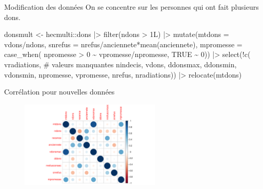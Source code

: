 \documentclass[
  ignorenonframetext,
]{beamer}
\newenvironment{Shaded}{\begin{snugshade}}{\end{snugshade}}
\newcommand{\AttributeTok}[1]{\textcolor[rgb]{0.40,0.45,0.13}{#1}}
\newcommand{\CommentTok}[1]{\textcolor[rgb]{0.37,0.37,0.37}{#1}}
\newcommand{\ConstantTok}[1]{\textcolor[rgb]{0.56,0.35,0.01}{#1}}
\newcommand{\DecValTok}[1]{\textcolor[rgb]{0.68,0.00,0.00}{#1}}
\newcommand{\FunctionTok}[1]{\textcolor[rgb]{0.28,0.35,0.67}{#1}}
\newcommand{\NormalTok}[1]{\textcolor[rgb]{0.00,0.23,0.31}{#1}}
\newcommand{\OtherTok}[1]{\textcolor[rgb]{0.00,0.23,0.31}{#1}}
\newcommand{\SpecialCharTok}[1]{\textcolor[rgb]{0.37,0.37,0.37}{#1}}
\begin{document}
\begin{frame}[fragile]{Modification des données}
\protect\hypertarget{modification-des-donnuxe9es}{}
On se concentre sur les personnes qui ont fait plusieurs dons.

\begin{Shaded}
\begin{Highlighting}[numbers=left,,]
\NormalTok{donsmult }\OtherTok{\textless{}{-}}\NormalTok{ hecmulti}\SpecialCharTok{::}\NormalTok{dons }\SpecialCharTok{|\textgreater{}}
  \FunctionTok{filter}\NormalTok{(ndons }\SpecialCharTok{\textgreater{}}\NormalTok{ 1L) }\SpecialCharTok{|\textgreater{}}
  \FunctionTok{mutate}\NormalTok{(}\AttributeTok{mtdons =}\NormalTok{ vdons}\SpecialCharTok{/}\NormalTok{ndons,}
         \AttributeTok{snrefus =}\NormalTok{ nrefus}\SpecialCharTok{/}\NormalTok{anciennete}\SpecialCharTok{*}\FunctionTok{mean}\NormalTok{(anciennete),}
         \AttributeTok{mpromesse =} \FunctionTok{case\_when}\NormalTok{(}
\NormalTok{           npromesse }\SpecialCharTok{\textgreater{}} \DecValTok{0} \SpecialCharTok{\textasciitilde{}}\NormalTok{ vpromesse}\SpecialCharTok{/}\NormalTok{npromesse,}
           \ConstantTok{TRUE} \SpecialCharTok{\textasciitilde{}} \DecValTok{0}\NormalTok{)) }\SpecialCharTok{|\textgreater{}}
  \FunctionTok{select}\NormalTok{(}\SpecialCharTok{!}\FunctionTok{c}\NormalTok{(}
\NormalTok{    vradiations, }\CommentTok{\# valeurs manquantes}
\NormalTok{    nindecis, vdons, ddonsmax,}
\NormalTok{    ddonsmin, vdonsmin, npromesse,}
\NormalTok{    vpromesse, nrefus, nradiations)) }\SpecialCharTok{|\textgreater{}}
  \FunctionTok{relocate}\NormalTok{(mtdons)}
\end{Highlighting}
\end{Shaded}
\end{frame}

\begin{frame}{Corrélation pour nouvelles données}
\protect\hypertarget{corruxe9lation-pour-nouvelles-donnuxe9es}{}
\begin{figure}

{\centering \includegraphics[width=0.6\textwidth,height=\textheight]{MATH60602-diapos11_files/figure-beamer/unnamed-chunk-5-1.pdf}

}

\end{figure}
\end{frame}
\end{document}
